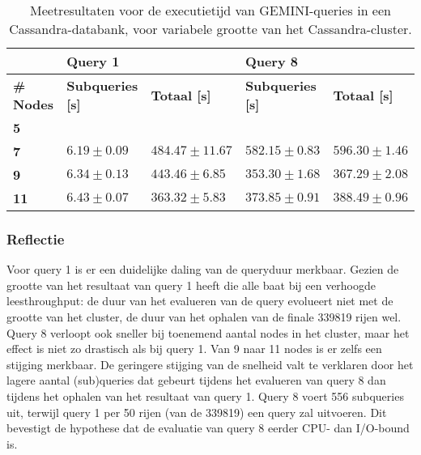 \begin{table}[!h]
\begin{tabular}{@{}lllll@{}}
\cmidrule(l){2-5}
                                       & \multicolumn{2}{|l|}{\textbf{Query 1}}                                                      & \multicolumn{2}{l|}{\textbf{Query 8}}                             \\ 
\midrule
\multicolumn{1}{|l|}{\textbf{\# Nodes}}  & \multicolumn{1}{l|}{\textbf{Subqueries [s]}}               & \multicolumn{1}{l|}{\textbf{Totaal [s]}} & \multicolumn{1}{l|}{\textbf{Subqueries [s]}} & \multicolumn{1}{l|}{\textbf{Totaal [s]}} \\ \midrule
\multicolumn{1}{|l|}{\textbf{5}} & \multicolumn{1}{l|}{$ $} & \multicolumn{1}{l|}{$ $}             & \multicolumn{1}{l|}{$ $}          & \multicolumn{1}{l|}{$ $}                        \\
\multicolumn{1}{|l|}{\textbf{7}} & \multicolumn{1}{l|}{$6.19 \pm 0.09$} &\multicolumn{1}{l|}{$484.47 \pm 11.67$}            & \multicolumn{1}{l|}{$582.15 \pm 0.83$}          & \multicolumn{1}{l|}{$596.30 \pm 1.46$}                        \\
\multicolumn{1}{|l|}{\textbf{9}} & \multicolumn{1}{l|}{$6.34 \pm 0.13$} &\multicolumn{1}{l|}{$443.46 \pm 6.85$}            & \multicolumn{1}{l|}{$353.30 \pm 1.68$}           & \multicolumn{1}{l|}{$367.29 \pm 2.08$}                        \\
\multicolumn{1}{|l|}{\textbf{11}} & \multicolumn{1}{l|}{$6.43 \pm 0.07$} &\multicolumn{1}{l|}{$363.32 \pm 5.83$}           & \multicolumn{1}{l|}{$373.85 \pm 0.91$}           & \multicolumn{1}{l|}{$388.49 \pm 0.96$}                        \\
\bottomrule
\end{tabular}
\caption{Meetresultaten voor de executietijd van GEMINI-queries in een Cassandra-databank, voor variabele grootte van het Cassandra-cluster.}
\end{table}

\subsubsection{Reflectie}

Voor query 1 is er een duidelijke daling van de queryduur merkbaar. Gezien de grootte van het resultaat van query 1 heeft die alle baat bij een verhoogde leesthroughput: de duur van het evalueren van de query evolueert niet met de grootte van het cluster, de duur van het ophalen van de finale 339819 rijen wel.\\
Query 8 verloopt ook sneller bij toenemend aantal nodes in het cluster, maar het effect is niet zo drastisch als bij query 1. Van 9 naar 11 nodes is er zelfs een stijging merkbaar. De geringere stijging van de snelheid valt te verklaren door het lagere aantal (sub)queries dat gebeurt tijdens het evalueren van query 8 dan tijdens het ophalen van het resultaat van query 1. Query 8 voert 556 subqueries uit, terwijl query 1 per 50 rijen (van de 339819) een query zal uitvoeren. Dit bevestigt de hypothese dat de evaluatie van query 8 eerder CPU- dan I/O-bound is.

